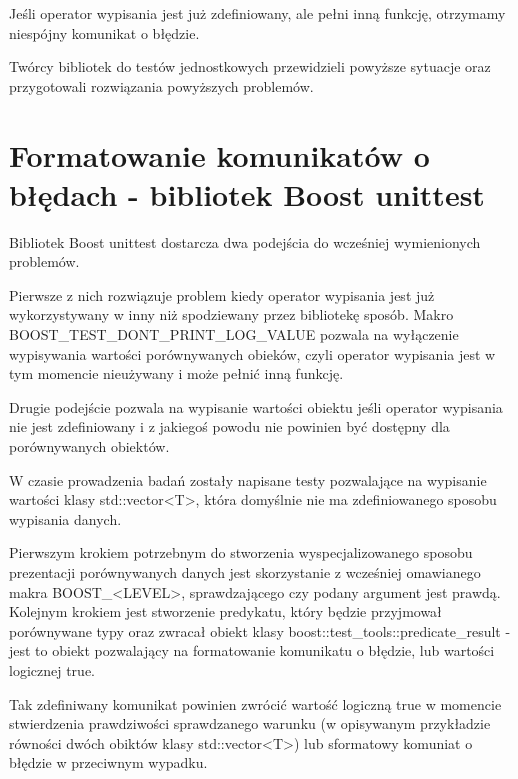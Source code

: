\documentclass[12pt,a4paper,notitlepage]{report}
\begin{document}
Jeśli operator wypisania jest już zdefiniowany, ale pełni inną funkcję, otrzymamy niespójny komunikat o błędzie.

Twórcy bibliotek do testów jednostkowych przewidzieli powyższe sytuacje oraz przygotowali rozwiązania powyższych problemów.

\section{Formatowanie komunikatów o błędach - bibliotek Boost unittest}

Bibliotek Boost unittest dostarcza dwa podejścia do wcześniej wymienionych problemów.

Pierwsze z nich rozwiązuje problem kiedy operator wypisania jest już wykorzystywany w inny niż spodziewany przez bibliotekę sposób. Makro BOOST{\_}TEST{\_}DONT{\_}PRINT{\_}LOG{\_}VALUE pozwala na wyłączenie wypisywania wartości porównywanych obieków, czyli operator wypisania jest w tym momencie nieużywany i może pełnić inną funkcję.

			

Drugie podejście pozwala na wypisanie wartości obiektu jeśli operator wypisania nie jest zdefiniowany i z jakiegoś powodu nie powinien być dostępny dla porównywanych obiektów.

W czasie prowadzenia badań zostały napisane testy pozwalające na wypisanie wartości klasy std::vector<T>, która domyślnie nie ma zdefiniowanego sposobu wypisania danych.

Pierwszym krokiem potrzebnym do stworzenia wyspecjalizowanego sposobu prezentacji porównywanych danych jest skorzystanie z wcześniej omawianego makra BOOST{\_}<LEVEL>, sprawdzającego czy podany argument jest prawdą. Kolejnym krokiem jest stworzenie predykatu, który będzie przyjmował porównywane typy oraz zwracał obiekt klasy boost::test{\_}tools::predicate{\_}result - jest to obiekt pozwalający na formatowanie komunikatu o błędzie, lub wartości logicznej true.

Tak zdefiniwany komunikat powinien zwrócić wartość logiczną true w momencie stwierdzenia prawdziwości sprawdzanego warunku (w opisywanym przykładzie równości dwóch obiktów klasy std::vector<T>) lub sformatowy komuniat o błędzie w przeciwnym wypadku.
\end{document}
